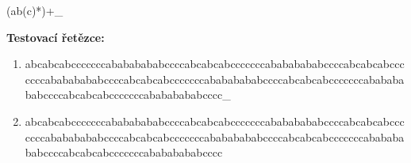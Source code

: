 \documentclass[czech,bachelor]{diploma}
\begin{document}
\begin{enumerate}
    (ab(c)*)+\_
    
    \noindent\textbf{Testovací řetězce:}

    \begin{enumerate}
        \item \parbox[t]{14cm}{abcabcabcccccccabababababccccabcabcabcccccccabababababccccabcabcabcccccccaba\-babababccccabcabcabcccccccabababababccccabcabcabcccccccabababababccccabcabca\-bcccccccabababababcccc\_ \setlength\parindent{1em} \textcolor{OliveGreen}{\Checkmark}} \label{itm:TD_7a}
        \item \parbox[t]{14cm}{abcabcabcccccccabababababccccabcabcabcccccccabababababccccabcabcabcccccccaba\-babababccccabcabcabcccccccabababababccccabcabcabcccccccabababababccccabcabca\-bcccccccabababababcccc \setlength\parindent{1em} \textcolor{Red}{\XSolid}} \label{itm:TD_7b}
    \end{enumerate}
\end{enumerate}

\end{document}
